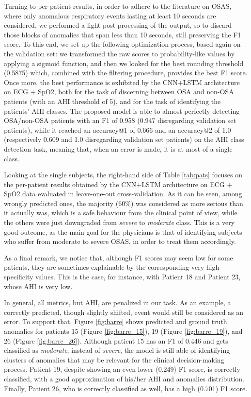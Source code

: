 \documentclass[5p,twocolumn,lefttitle]{elsarticle}
\begin{document}
Turning to per-patient results, in order to adhere to the literature on OSAS, where only anomalous respiratory events lasting at least 10 seconds are considered, we performed a light post-processing of the output, so to discard those blocks of anomalies that span less than 10 seconds, still preserving the F1 score. To this end, we set up the following optimization process,  based again on the validation set:  we transformed the raw scores to probability-like values by applying a sigmoid function, and then  we looked for the best rounding threshold (0.5875) which, combined with the filtering procedure, provides the best F1 score. Once more, the best performance is exhibited by the CNN+LSTM architecture on ECG + SpO2, both for the task of discerning between OSA and non-OSA patients (with an AHI threshold of 5), and for the task of identifying the patients' AHI classes. The proposed model is able to almost perfectly detecting OSA/non-OSA patients with an F1 of 0.958 (0.947 disregarding validation set patients), while it reached an accuracy@1 of 0.666 and an accuracy@2 of 1.0 (respectively 0.609 and 1.0 disregarding validation set patients) on the AHI class detection task, meaning that, when an error is made, it is at most of a single class. 

Looking at the single subjects, the right-hand side of Table \ref{tab:pats} focuses on the per-patient results obtained by the CNN+LSTM architecture on ECG + SpO2 data evaluated in leave-one-out cross-validation. As it can be seen, among wrongly predicted ones, the majority (60\%) was considered as more serious than it actually was, which is a safe behaviour from the clinical point of view, while the others were just downgraded from \emph{severe} to \emph{moderate} class. This is a very good outcome, as the main goal for the physicians is that of identifying subjects who suffer from moderate to severe OSAS, in order to treat them accordingly.

As a final remark, we notice that, although F1 scores may seem low for some patients, they are sometimes explainable by the corresponding very high specificity values. This is the case, for instance, with Patient 18 and Patient 23, whose AHI is very low. 

In general, all metrics, but AHI, are penalized in our task. As an example, a correctly predicted, though slightly shifted, event would still be considered as an error. To support that, Figure \ref{fig:barre} shows predicted and ground truth anomalies for patients 15 (Figure \ref{fig:barre_15}), 19 (Figure \ref{fig:barre_19}), and 26 (Figure \ref{fig:barre_26}). Although patient 15 has an F1 of 0.446 and gets classified as \emph{moderate}, instead of \emph{severe}, the model is still able of identifying clusters of anomalies that may be relevant for the clinical decision-making process. Patient 19, despite showing an even lower (0.249) F1 score, is correctly classified, with a good approximation of his/her AHI and anomalies distribution. Finally, Patient 26, who is correctly classified as well, has a high (0.701) F1 score.
\end{document}
